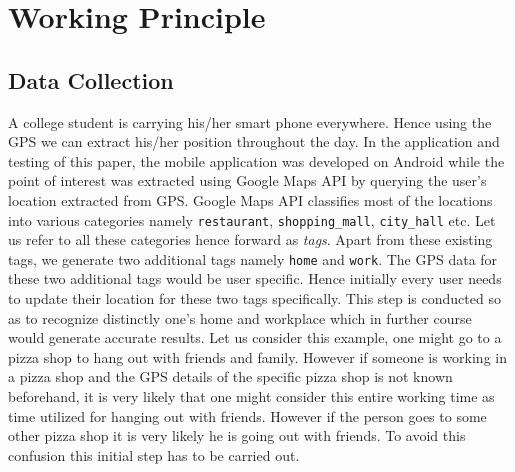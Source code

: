 \documentclass[conference]{IEEEtran}
\begin{document}



\section{Working Principle}

\subsection{Data Collection}

A college student is carrying his/her smart phone everywhere. Hence using the GPS we can extract his/her position throughout the day. In the application and testing of this paper, the mobile application was developed on Android while the point of interest was extracted using Google Maps API by querying the user\rq s location extracted from GPS. Google Maps API classifies most of the locations into various categories namely \texttt{restaurant}, \texttt{shopping\_mall}, \texttt{city\_hall} etc. Let us refer to all these categories hence forward as \textit{tags}. Apart from these existing tags, we generate two additional tags namely \texttt{home} and \texttt{work}. The GPS data for these two additional tags would be user specific. Hence initially every user needs to update their location for these two tags specifically. This step is conducted so as to recognize distinctly one\rq s home and workplace which in further course would generate accurate results. Let us consider this example, one might go to a pizza shop to hang out with friends and family. However if someone is working in a pizza shop and the GPS details of the specific pizza shop is not known beforehand, it is very likely that one might consider this entire working time as time utilized for hanging out with friends. However if the person goes to some other pizza shop it is very likely he is going out with friends. To avoid this confusion this initial step has to be carried out.
\end{document}

